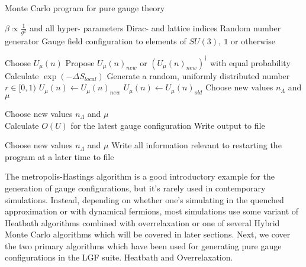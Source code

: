 \documentclass[a4paper,10pt]{article}
\begin{document}
\begin{algorithm}[H]
\caption{Monte Carlo program for pure gauge theory}\label{alg:cap}
\begin{algorithmic}

\Ensure 
\State $\beta \propto \frac{1}{g^2}$ and all hyper- parameters
\State Dirac- and lattice indices
\State Random number generator 
\State Gauge field configuration to elements of $SU(3)$, $\mathbb{1}$ or otherwise

\State Choose $U_\mu(n)$
\State Propose $U_\mu(n)_{new}$ or $(U_\mu(n)_{new})^\dagger$ with equal probability
\State Calculate $\exp (-\Delta S_{local})$
\State Generate a random, uniformly distributed number $r \in [0,1) $
    \State $U_\mu(n) \gets U_\mu(n)_{new}$
\Else
    \State $U_\mu(n) \gets U_\mu(n)_{old}$
\EndIf
\EndFunction
\State Choose new values $n_\Lambda$ and $\mu$
\EndWhile



\State Choose new values $n_\Lambda$ and $\mu$
\EndFunction
\EndWhile\\

\State Calculate $O(U)$ for the latest gauge configuration
\State Write output to file 

\EndFunction
\State Choose new values $n_\Lambda$ and $\mu$
\EndWhile
\State Write all information relevant to restarting the program at a later time to file 
\end{algorithmic}
\end{algorithm}
The metropolis-Hastings algorithm is a good introductory example for the generation of gauge configurations, but it's rarely used in contemporary simulations. Instead, depending on whether one's simulating in the quenched approximation or with dynamical fermions, most simulations use some variant of Heatbath algorithms combined with overrelaxation or one of several Hybrid Monte Carlo algorithms which will be covered in later sections. Next, we cover the two primary algorithms which have been used for generating pure gauge configurations in the LGF suite. Heatbath and Overrelaxation.
\end{document}
